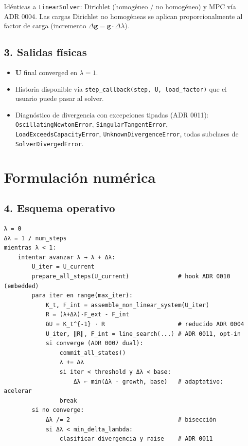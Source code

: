 \documentclass[11pt,letterpaper,oneside]{report}
\begin{document}
Idénticas a \texttt{LinearSolver}: Dirichlet (homogéneo / no homogéneo) y MPC vía ADR 0004. Las cargas Dirichlet no homogéneas se aplican proporcionalmente al factor de carga (incremento $\Delta\mathbf g = \mathbf g \cdot \Delta\lambda$).

\subsection{3. Salidas físicas}

\begin{itemize}
  \item $\mathbf U$ final converged en $\lambda = 1$.
  \item Historia disponible vía \texttt{step\_callback(step, U, load\_factor)} que el usuario puede pasar al solver.
  \item Diagnóstico de divergencia con excepciones tipadas (ADR 0011): \texttt{OscillatingNewtonError}, \texttt{SingularTangentError}, \texttt{LoadExceedsCapacityError}, \texttt{UnknownDivergenceError}, todas subclases de \texttt{SolverDivergedError}.
\end{itemize}


\section{Formulación numérica}

\subsection{4. Esquema operativo}

\begin{lstlisting}
λ = 0
Δλ = 1 / num_steps
mientras λ < 1:
    intentar avanzar λ → λ + Δλ:
        U_iter = U_current
        prepare_all_steps(U_current)              # hook ADR 0010 (embedded)
        para iter en range(max_iter):
            K_t, F_int = assemble_non_linear_system(U_iter)
            R = (λ+Δλ)·F_ext - F_int
            δU = K_t^{-1} · R                     # reducido ADR 0004
            U_iter, ‖R‖, F_int = line_search(...) # ADR 0011, opt-in
            si converge (ADR 0007 dual):
                commit_all_states()
                λ += Δλ
                si iter < threshold y Δλ < base:
                    Δλ ← min(Δλ · growth, base)   # adaptativo: acelerar
                break
        si no converge:
            Δλ /= 2                               # bisección
            si Δλ < min_delta_lambda:
                clasificar divergencia y raise    # ADR 0011

\end{lstlisting}
\end{document}

